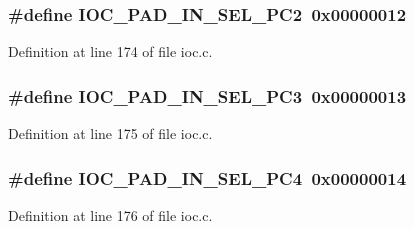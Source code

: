 \subsubsection[{\texorpdfstring{I\+O\+C\+\_\+\+P\+A\+D\+\_\+\+I\+N\+\_\+\+S\+E\+L\+\_\+\+P\+C2}{IOC_PAD_IN_SEL_PC2}}]{\setlength{\rightskip}{0pt plus 5cm}\#define I\+O\+C\+\_\+\+P\+A\+D\+\_\+\+I\+N\+\_\+\+S\+E\+L\+\_\+\+P\+C2~0x00000012}\hypertarget{group__ioc__api_ga4695471be6b454697aef79e92588a49e}{}\label{group__ioc__api_ga4695471be6b454697aef79e92588a49e}


Definition at line 174 of file ioc.\+c.

\subsubsection[{\texorpdfstring{I\+O\+C\+\_\+\+P\+A\+D\+\_\+\+I\+N\+\_\+\+S\+E\+L\+\_\+\+P\+C3}{IOC_PAD_IN_SEL_PC3}}]{\setlength{\rightskip}{0pt plus 5cm}\#define I\+O\+C\+\_\+\+P\+A\+D\+\_\+\+I\+N\+\_\+\+S\+E\+L\+\_\+\+P\+C3~0x00000013}\hypertarget{group__ioc__api_ga243c10be27ff40607aaef241a7a0946d}{}\label{group__ioc__api_ga243c10be27ff40607aaef241a7a0946d}


Definition at line 175 of file ioc.\+c.

\subsubsection[{\texorpdfstring{I\+O\+C\+\_\+\+P\+A\+D\+\_\+\+I\+N\+\_\+\+S\+E\+L\+\_\+\+P\+C4}{IOC_PAD_IN_SEL_PC4}}]{\setlength{\rightskip}{0pt plus 5cm}\#define I\+O\+C\+\_\+\+P\+A\+D\+\_\+\+I\+N\+\_\+\+S\+E\+L\+\_\+\+P\+C4~0x00000014}\hypertarget{group__ioc__api_ga0afc2cf588c9b0eb23a761da5fb4c416}{}\label{group__ioc__api_ga0afc2cf588c9b0eb23a761da5fb4c416}


Definition at line 176 of file ioc.\+c.

